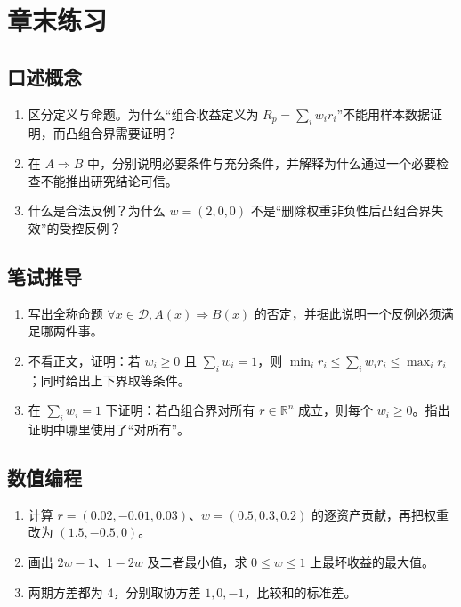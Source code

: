 \section*{章末练习}
\begingroup\small
\subsection*{口述概念}
\begin{enumerate}[nosep,leftmargin=*]
  \item 区分定义与命题。为什么“组合收益定义为 $R_p=\sum_iw_ir_i$”不能用样本数据证明，而凸组合界需要证明？
  \item 在 $A\Rightarrow B$ 中，分别说明必要条件与充分条件，并解释为什么通过一个必要检查不能推出研究结论可信。
  \item 什么是合法反例？为什么 $w=(2,0,0)$ 不是“删除权重非负性后凸组合界失效”的受控反例？
\end{enumerate}

\subsection*{笔试推导}
\begin{enumerate}[nosep,leftmargin=*]
  \item 写出全称命题 $\forall x\in\mathcal D,A(x)\Rightarrow B(x)$ 的否定，并据此说明一个反例必须满足哪两件事。
  \item 不看正文，证明：若 $w_i\geq0$ 且 $\sum_iw_i=1$，则 $\min_i r_i\leq\sum_iw_ir_i\leq\max_i r_i$；同时给出上下界取等条件。
  \item 在 $\sum_iw_i=1$ 下证明：若凸组合界对所有 $r\in\mathbb R^n$ 成立，则每个 $w_i\geq0$。指出证明中哪里使用了“对所有”。
\end{enumerate}

\subsection*{数值编程}
\begin{enumerate}[leftmargin=*]
  \item 计算 $r=(0.02,-0.01,0.03)$、$w=(0.5,0.3,0.2)$ 的逐资产贡献，再把权重改为 $(1.5,-0.5,0)$。
  \item 画出 $2w-1$、$1-2w$ 及二者最小值，求 $0\leq w\leq1$ 上最坏收益的最大值。
  \item 两期方差都为 4，分别取协方差 $1,0,-1$，比较和的标准差。
\end{enumerate}

